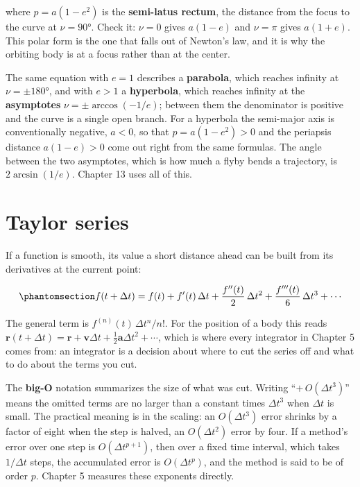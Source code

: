\documentclass[
  10.5pt,
  letterpaper,
]{scrbook}
\theoremstyle{plain}
\theoremstyle{remark}
\begin{document}
where \(p = a(1-e^2)\) is the \textbf{semi-latus rectum}, the distance
from the focus to the curve at \(\nu = 90°\). Check it: \(\nu = 0\)
gives \(a(1-e)\) and \(\nu = \pi\) gives \(a(1+e)\). This polar form is
the one that falls out of Newton's law, and it is why the orbiting body
is at a focus rather than at the center.

The same equation with \(e = 1\) describes a \textbf{parabola}, which
reaches infinity at \(\nu = \pm 180°\), and with \(e > 1\) a
\textbf{hyperbola}, which reaches infinity at the \textbf{asymptotes}
\(\nu = \pm\arccos(-1/e)\); between them the denominator is positive and
the curve is a single open branch. For a hyperbola the semi-major axis
is conventionally negative, \(a < 0\), so that \(p = a(1-e^2) > 0\) and
the periapsis distance \(a(1-e) > 0\) come out right from the same
formulas. The angle between the two asymptotes, which is how much a
flyby bends a trajectory, is \(2\arcsin(1/e)\). Chapter 13 uses all of
this.

\section{Taylor series}\label{taylor-series}

If a function is smooth, its value a short distance ahead can be built
from its derivatives at the current point:

\begin{equation}\protect\phantomsection\label{eq-taylor-general}{
f(t + \Delta t) = f(t) + f'(t)\,\Delta t + \frac{f''(t)}{2}\,\Delta t^2 + \frac{f'''(t)}{6}\,\Delta t^3 + \cdots
}\end{equation}

The general term is \(f^{(n)}(t)\,\Delta t^n/n!\). For the position of a
body this reads
\(\mathbf{r}(t+\Delta t) = \mathbf{r} + \mathbf{v}\Delta t + \tfrac12\mathbf{a}\Delta t^2 + \cdots\),
which is where every integrator in Chapter 5 comes from: an integrator
is a decision about where to cut the series off and what to do about the
terms you cut.

The \textbf{big-O} notation summarizes the size of what was cut. Writing
``\(+\,O(\Delta t^3)\)'' means the omitted terms are no larger than a
constant times \(\Delta t^3\) when \(\Delta t\) is small. The practical
meaning is in the scaling: an \(O(\Delta t^3)\) error shrinks by a
factor of eight when the step is halved, an \(O(\Delta t^2)\) error by
four. If a method's error over one step is \(O(\Delta t^{p+1})\), then
over a fixed time interval, which takes \(1/\Delta t\) steps, the
accumulated error is \(O(\Delta t^p)\), and the method is said to be of
order \(p\). Chapter 5 measures these exponents directly.
\end{document}
